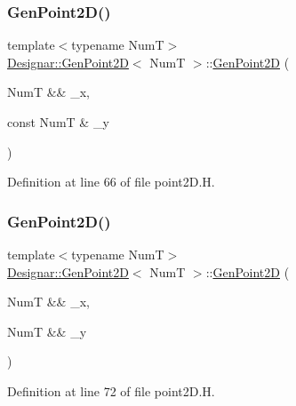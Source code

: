 \subsubsection{\texorpdfstring{Gen\+Point2\+D()}{GenPoint2D()}\hspace{0.1cm}{\footnotesize\ttfamily [4/7]}}
{\footnotesize\ttfamily template$<$typename NumT$>$ \\
\hyperlink{class_designar_1_1_gen_point2_d}{Designar\+::\+Gen\+Point2D}$<$ NumT $>$\+::\hyperlink{class_designar_1_1_gen_point2_d}{Gen\+Point2D} (\begin{DoxyParamCaption}\item[{NumT \&\&}]{\+\_\+x,  }\item[{const NumT \&}]{\+\_\+y }\end{DoxyParamCaption})\hspace{0.3cm}{\ttfamily [inline]}}



Definition at line 66 of file point2\+D.\+H.

\mbox{\label{class_designar_1_1_gen_point2_d_a420eb654ce7cbb0a9f179c20db4e7c98}} 
\subsubsection{\texorpdfstring{Gen\+Point2\+D()}{GenPoint2D()}\hspace{0.1cm}{\footnotesize\ttfamily [5/7]}}
{\footnotesize\ttfamily template$<$typename NumT$>$ \\
\hyperlink{class_designar_1_1_gen_point2_d}{Designar\+::\+Gen\+Point2D}$<$ NumT $>$\+::\hyperlink{class_designar_1_1_gen_point2_d}{Gen\+Point2D} (\begin{DoxyParamCaption}\item[{NumT \&\&}]{\+\_\+x,  }\item[{NumT \&\&}]{\+\_\+y }\end{DoxyParamCaption})\hspace{0.3cm}{\ttfamily [inline]}}



Definition at line 72 of file point2\+D.\+H.

\mbox{\label{class_designar_1_1_gen_point2_d_abb677c76a6cfb8261f562250a15ca879}} 
